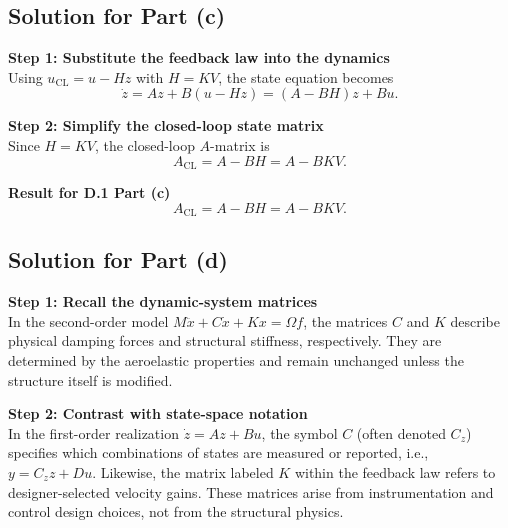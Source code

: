 \documentclass[12pt]{article}
\begin{document}
\subsection*{Solution for Part (c)}

\begin{stepbox}
\textbf{Step 1: Substitute the feedback law into the dynamics}\\[0.5em]
Using $u_{\text{CL}} = u - H z$ with $H = K V$, the state equation becomes
\[
\dot{z} = A z + B(u - H z) = (A - B H) z + B u.
\]
\end{stepbox}

\begin{stepbox}
\textbf{Step 2: Simplify the closed-loop state matrix}\\[0.5em]
Since $H = K V$, the closed-loop $A$-matrix is
\[
A_{\text{CL}} = A - B H = A - B K V.
\]
\end{stepbox}

\begin{resultsbox}
\textbf{Result for D.1 Part (c)}\\[0.5em]
\[
A_{\text{CL}} = A - B H = A - B K V.
\]
\end{resultsbox}

\subsection*{Solution for Part (d)}

\begin{stepbox}
\textbf{Step 1: Recall the dynamic-system matrices}\\[0.5em]
In the second-order model $M\ddot{x}+C\dot{x}+Kx=\Omega f$, the matrices $C$ and $K$ describe physical damping forces and structural stiffness, respectively.  They are determined by the aeroelastic properties and remain unchanged unless the structure itself is modified.
\end{stepbox}

\begin{stepbox}
\textbf{Step 2: Contrast with state-space notation}\\[0.5em]
In the first-order realization $\dot{z}=Az+Bu$, the symbol $C$ (often denoted $C_z$) specifies which combinations of states are measured or reported, i.e., $y=C_z z + D u$.  Likewise, the matrix labeled $K$ within the feedback law refers to designer-selected velocity gains.  These matrices arise from instrumentation and control design choices, not from the structural physics.
\end{stepbox}
\end{document}
